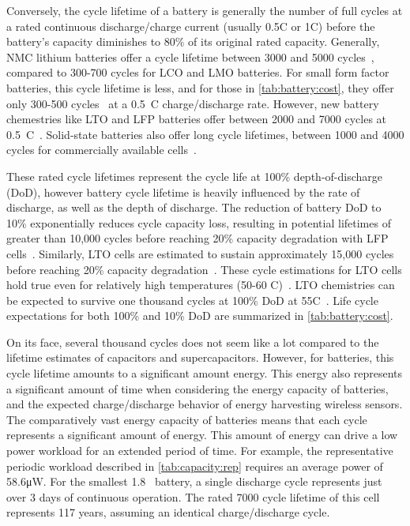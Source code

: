 Conversely, the cycle lifetime of a battery is generally the number of full cycles at a rated continuous discharge/charge current (usually 0.5C or 1C) before the battery's capacity diminishes to 80\% of its original rated capacity.
Generally, NMC lithium batteries offer a cycle lifetime between 3000 and 5000 cycles~\cite{richter2017measurements,preger2020degradation}, compared to 300-700 cycles for LCO and LMO batteries.
For small form factor batteries, this cycle lifetime is less, and for those in \cref{tab:battery:cost}, they offer only 300-500 cycles~\cite{lipoDatasheet, millibatNimbus} at a 0.5~C charge/discharge rate.
However, new battery chemestries like LTO and LFP batteries offer between 2000 and 7000 cycles at 0.5~C~\cite{hallExperimental18, LTODatasheet, LTODatasheet2,omarLithium14, sarasketaCycle15, wangCycle11,lifepo4Datasheet, preger2020degradation}. Solid-state batteries also offer long cycle lifetimes, between 1000 and 4000 cycles for commercially available cells~\cite{stEnfilm,tdkCeraCharge}.

These rated cycle lifetimes represent the cycle life at 100\% depth-of-discharge (DoD), however battery cycle lifetime is heavily influenced by the rate of discharge, as well as the depth of discharge.
The reduction of battery DoD to 10\%
exponentially reduces cycle capacity loss, resulting in potential
lifetimes of greater than 10,000 cycles before reaching 20\% capacity degradation with LFP cells~\cite{omarLithium14, wangCycle11}. Similarly, LTO cells are estimated to sustain approximately 15,000 cycles before reaching 20\% capacity degradation~\cite{stroe2018accelerated}.
These cycle estimations for LTO cells hold true even for relatively high temperatures (50-60\textdegree
C)~\cite{wangCycle11, stroe2018accelerated}.
LTO chemistries can be expected to survive one thousand
cycles at 100\% DoD at 55\textdegree C~\cite{han2014cycle}.
Life cycle
expectations for both 100\% and 10\% DoD are summarized in
\cref{tab:battery:cost}.

On its face, several thousand cycles does not seem like a lot compared to the lifetime estimates of capacitors and supercapacitors. However, for batteries, this cycle lifetime amounts to a significant amount energy. This energy also represents a significant amount of time when considering the energy capacity of batteries, and the expected charge/discharge behavior of energy harvesting wireless sensors.
The comparatively vast energy capacity of batteries means that each cycle represents a significant amount of energy. This amount of energy can drive a low power workload for an extended period of time. For example, the representative periodic workload described in \cref{tab:capacity:rep} requires an average power of 58.6\si{\micro\watt}. For the smallest 1.8\si{\milli\Ah} battery, a single discharge cycle represents just over 3 days of continuous operation. The rated 7000 cycle lifetime of this cell represents 117 years, assuming an identical charge/discharge cycle. 

